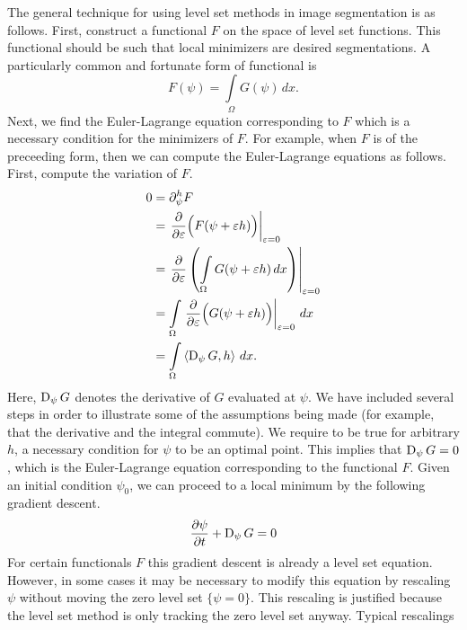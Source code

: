     The general technique for using level set methods in image segmentation is as follows.
    First, construct a functional \(F\) on the space of level set functions. This functional
    should be such that local minimizers are desired segmentations. A particularly
    common and fortunate form of functional is
    \[
        F(\psi) = \int \limits_\Omega G(\psi) \, dx.
    \]
    Next, we find the Euler-Lagrange equation corresponding to \(F\) which
    is a necessary condition for the minimizers of \(F\). For example,
    when \(F\) is of the preceeding form, then we can compute the
    Euler-Lagrange equations as follows. First, compute the \Gateaux
    variation of \(F\).
    \begin{align}
        0
            & = \partial_\psi^h F
            \nonumber
            \\
            & = \left. \frac{\partial}{\partial \varepsilon} \Big( F(\psi + \varepsilon h) \Big) \right|_{\varepsilon = 0}
            \nonumber
            \\
            & = \left. \frac{\partial}{\partial \varepsilon} \left( \int \limits_\Omega G(\psi + \varepsilon h) \, dx \right) \right|_{\varepsilon = 0}
            \nonumber
            \\
            & = \int \limits_\Omega \left. \frac{\partial}{\partial \varepsilon} \Big( G(\psi + \varepsilon h) \Big) \right|_{\varepsilon = 0} \, dx 
            \nonumber
            \\
            & = \int \limits_\Omega \left<\operatorname{D}_\psi G, h\right> \, dx.
            \label{eqn:ls-el}
    \end{align}
    Here, \(\operatorname{D}_\psi G\) denotes the \Frechet derivative of \(G\) evaluated at \(\psi\).
    We have included several steps in order to illustrate some of the assumptions being
    made (for example, that the derivative and the integral commute).
    We require  to be true for arbitrary \(h\), a necessary condition
    for \(\psi\) to be an optimal point. This implies that \(\operatorname{D}_\psi G = 0\), which
    is the Euler-Lagrange equation corresponding to the functional \(F\).
    Given an initial condition \(\psi_0\), we can proceed to a local minimum by
    the following gradient descent.
    \[
        \frac{\partial \psi}{\partial t} + \operatorname{D}_\psi G = 0
    \]
    For certain functionals \(F\) this gradient descent is already
    a level set equation. However, in some cases it may be necessary to
    modify this equation by rescaling \(\psi\) without moving the zero
    level set \(\{\psi = 0\}\). This rescaling is justified because the level
    set method is only tracking the zero level set anyway. Typical rescalings
